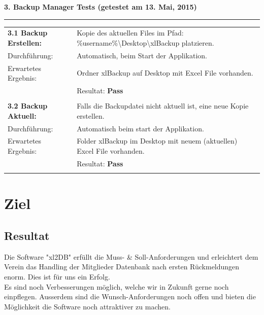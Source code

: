 \documentclass{article}
\begin{document}
\textbf{3. Backup Manager Tests (getestet am 13. Mai, 2015)\\}
\rule[2mm]{1\linewidth}{0.3mm}
\begin{tabular}{l|p{12cm}}
	\textbf{3.1 Backup Erstellen:} & Kopie des aktuellen Files im Pfad: \%username\%\textbackslash Desktop\textbackslash xlBackup platzieren. \\
		Durchführung:			& Automatisch, beim Start der Applikation.\\
		Erwartetes Ergebnis: 	& Ordner xlBackup auf Desktop mit Excel File vorhanden. \\
								& Resultat:  \textbf{Pass}\hspace{9cm} \color{green} {\ding{51}} \\
								\\	
	
	\textbf{3.2 Backup Aktuell:} & Falls die Backupdatei nicht aktuell ist, eine neue Kopie erstellen. \\
		Durchführung:			& Automatisch beim start der Applikation.\\
		Erwartetes Ergebnis: 	& Folder xlBackup im Desktop mit neuem (aktuellen) Excel File vorhanden. \\
								& Resultat:  \textbf{Pass}\hspace{9cm} \color{green} {\ding{51}} \\
								\\	
\end{tabular}
						

\newpage


\section{Ziel}
\subsection{Resultat}

Die Software "xl2DB" erfüllt die Muss- \& Soll-Anforderungen und erleichtert dem Verein das Handling der Mitglieder Datenbank nach ersten Rückmeldungen enorm. Dies ist für uns ein Erfolg. \\
Es sind noch Verbesserungen möglich, welche wir in Zukunft gerne noch einpflegen. Ausserdem sind die Wunsch-Anforderungen noch offen und bieten die Möglichkeit die Software noch attraktiver zu machen.
\end{document}
